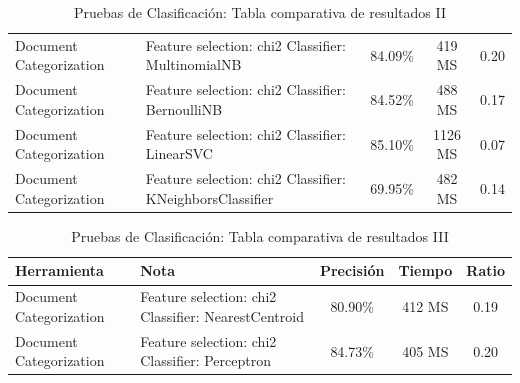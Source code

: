 \documentclass[runningheads,a4paper]{llncs}
\theoremstyle{break}
\newcommand{\rowstyle}[1]{\gdef\currentrowstyle{#1}%
  #1\ignorespaces
}
\begin{document}
\begin{table}
\begin{tabular}{p{2.8cm}|p{4cm}|c|c|c}
Document \newline Categorization &  Feature selection: chi2 \newline Classifier: MultinomialNB 
& 84.09\% & 419 MS & 0.20\\
Document \newline Categorization &  Feature selection: chi2 \newline Classifier: BernoulliNB 
& 84.52\% & 488 MS & 0.17 \\
Document \newline Categorization &  Feature selection: chi2 \newline Classifier: LinearSVC 
& 85.10\% & 1126 MS & 0.07 \\
Document \newline Categorization &  Feature selection: chi2 \newline Classifier: KNeighborsClassifier 
& 69.95\% & 482 MS & 0.14 \\ \hline
\end{tabular}
\vspace{1em}
\caption{Pruebas de Clasificación: Tabla comparativa de resultados II}
\end{table}
\egroup
\vspace{-1.5em}


\bgroup
\setlength{\tabcolsep}{10pt}
\def\arraystretch{1.8}
\begin{table}
\begin{tabular}{p{2.8cm}|p{4cm}|c|c|c}

\rowstyle{\bfseries} Herramienta & \rowstyle{\bfseries} Nota & \rowstyle{\bfseries} Precisión & \rowstyle{\bfseries} Tiempo & \rowstyle{\bfseries} Ratio\\ \hline

Document \newline Categorization &  Feature selection: chi2 \newline Classifier: NearestCentroid 
& 80.90\% & 412 MS & 0.19 \\
Document \newline Categorization &  Feature selection: chi2 \newline Classifier: Perceptron 
& 84.73\% & 405 MS & 0.20 \\ \hline

\end{tabular}
\vspace{1em}
\caption{Pruebas de Clasificación: Tabla comparativa de resultados III}
\end{table}
\egroup
\end{document}
